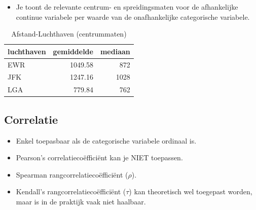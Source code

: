 \documentclass[]{tufte-book}
\providecommand{\tightlist}{%
  \setlength{\itemsep}{0pt}\setlength{\parskip}{0pt}}
\begin{document}
\begin{itemize}
\tightlist
\item
  Je toont de relevante centrum- en spreidingsmaten voor de afhankelijke continue variabele per waarde van de onafhankelijke categorische variabele.
\end{itemize}

\begin{table}

\caption{\label{tab:4-17}Afstand-Luchthaven (centrummaten)}
\centering
\fontsize{10}{12}\selectfont
\begin{tabular}[t]{lrr}
\toprule
luchthaven & gemiddelde & mediaan\\
\midrule
EWR & 1049.58 & 872\\
JFK & 1247.16 & 1028\\
LGA & 779.84 & 762\\
\bottomrule
\end{tabular}
\end{table}

\begin{table}

\caption{\label{tab:4-18}Afstand-Luchthaven (spreidingsmaten)}
\centering
{}
\end{table}

\hypertarget{correlatie-1}{%
\subsection*{Correlatie}\label{correlatie-1}}

\begin{itemize}
\tightlist
\item
  Enkel toepasbaar als de categorische variabele ordinaal is.
\item
  Pearson's correlatiecoëfficiënt kan je NIET toepassen.
\item
  Spearman rangcorrelatiecoëfficiënt (\(\rho\)).
\item
  Kendall's rangcorrelatiecoëfficiënt (\(\tau\)) kan theoretisch wel toegepast worden, maar is in de praktijk vaak niet haalbaar.
\end{itemize}
\end{document}
